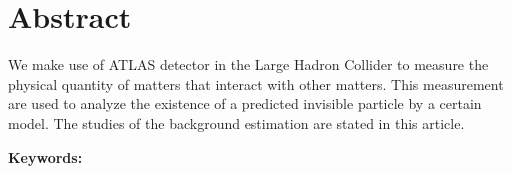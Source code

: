 \documentclass[class=NCU_thesis, crop=false]{standalone}
\begin{document}
\chapter{Abstract}
	We make use of ATLAS detector in the Large Hadron Collider to measure the physical quantity of matters that interact with other matters. This measurement are used to analyze the existence of a predicted invisible particle by a certain model. The studies of the background estimation are stated in this article.

\vspace{2em}
\noindent \textbf{Keywords:} \keywordsEn{} %
\end{document}
